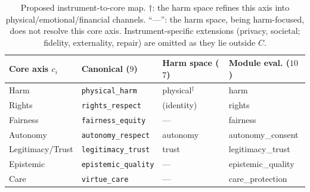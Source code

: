 \begin{table}[h]
\centering
\small
\begin{tabular}{@{}llll@{}}
\toprule
Core axis $c_i$ & Canonical ($9$) & Harm space ($7$) & Module eval. ($10$) \\
\midrule
Harm              & \texttt{physical\_harm}    & physical$^\dagger$ & harm \\
Rights            & \texttt{rights\_respect}   & (identity)         & rights \\
Fairness          & \texttt{fairness\_equity}  & ---                & fairness \\
Autonomy          & \texttt{autonomy\_respect} & autonomy           & autonomy\_consent \\
Legitimacy/Trust  & \texttt{legitimacy\_trust} & trust              & legitimacy\_trust \\
Epistemic         & \texttt{epistemic\_quality}& ---                & epistemic\_quality \\
Care              & \texttt{virtue\_care}      & ---                & care\_protection \\
\bottomrule
\end{tabular}
\caption{Proposed instrument-to-core map. $\dagger$: the harm space refines this axis into
physical/emotional/financial channels. ``---'': the harm space, being harm-focused, does not
resolve this core axis. Instrument-specific extensions (privacy, societal; fidelity,
externality, repair) are omitted as they lie outside $C$.}
\label{tab:map}
\end{table}

